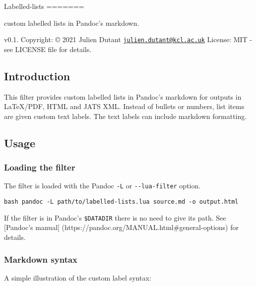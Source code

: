 Labelled-lists =======

custom labelled lists in Pandoc's markdown.

v0.1. Copyright: © 2021 Julien Dutant
\href{mailto:julien.dutant@kcl.ac.uk}{\nolinkurl{julien.dutant@kcl.ac.uk}}
License: MIT - see LICENSE file for details.

\hypertarget{introduction}{%
\subsection{Introduction}\label{introduction}}

This filter provides custom labelled lists in Pandoc's markdown for
outputs in LaTeX/PDF, HTML and JATS XML. Instead of bullets or numbers,
list items are given custom text labels. The text labels can include
markdown formatting.

\hypertarget{usage}{%
\subsection{Usage}\label{usage}}

\hypertarget{loading-the-filter}{%
\subsubsection{Loading the filter}\label{loading-the-filter}}

The filter is loaded with the Pandoc \texttt{-L} or
\texttt{-\/-lua-filter} option.

\texttt{bash\ pandoc\ -L\ path/to/labelled-lists.lua\ source.md\ -o\ output.html}

If the filter is in Pandoc's \texttt{\$DATADIR} there is no need to give
its path. See {[}Pandoc's manual{[}
(https://pandoc.org/MANUAL.html\#general-options) for details.

\hypertarget{markdown-syntax}{%
\subsubsection{Markdown syntax}\label{markdown-syntax}}

A simple illustration of the custom label syntax:

\begin{Shaded}
\begin{Highlighting}[]
\SpecialStringTok{* }\CommentTok{[}\CommentTok{]}
\SpecialStringTok{* }\CommentTok{[}\CommentTok{]}
\SpecialStringTok{* }\CommentTok{[}\CommentTok{]}
\end{Highlighting}
\end{Shaded}

